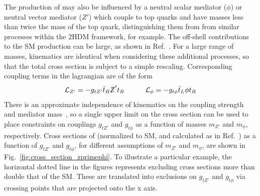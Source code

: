 The production of \tttt may also be influenced by a neutral scalar mediator
($\phi$) or neutral vector mediator ($Z'$) which couple to top quarks and have
masses less than twice the mass of the top quark, distinguishing them from
from similar processes within the 2HDM framework, for example. The off-shell contributions
to the SM \tttt production can be large, as shown in
Ref.~\cite{THEORY:Alvarez2016nrz}. For a large range of masses, kinematics are identical when considering these additional
processes, so that the total \tttt cross section is subject to a simple
rescaling.  Corresponding coupling terms in the lagrangian are of the form
\begin{equation}
    \mathcal{L}_{Z'}=-g_{t Z'}\bar{t}_R \slashed{Z}' t_R
    \quad\quad\quad
    \mathcal{L}_{\phi}=-g_{t \phi}\bar{t}_L \phi t_R
\end{equation}
There is an approximate independence of kinematics on the coupling strength and mediator mass~\cite{THEORY:Alvarez2016nrz},
so a single upper limit on the \tttt cross section can be used to place constraints 
on couplings $g_{tZ'}$ and $g_{t\phi}$ as a function of masses $m_{Z'}$ and $m_{\phi}$,
respectively.
Cross sections of \tttt (normalized to SM, and calculated as in Ref.~\cite{THEORY:Alvarez2016nrz}) as a function of $g_{tZ'}$ 
and $g_{t\phi}$, for different assumptions of $m_{Z'}$ and $m_{\phi}$,
are shown in Fig.~\ref{fig:cross_section_zprimephi}. To illustrate a particular example,
the horizontal dotted line in the figures represents excluding cross sections more than
double that of the SM. These are translated into exclusions on $g_{tZ'}$ and $g_{t\phi}$
via crossing points that are projected onto the x axis.

